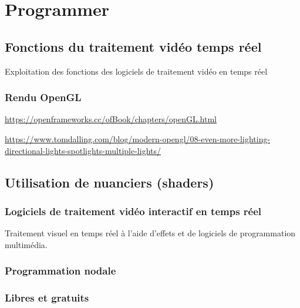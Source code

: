 \documentclass[
  french,
]{book}
\begin{document}
\hypertarget{programmer}{%
\chapter{Programmer}\label{programmer}}

\hypertarget{fonctions-du-traitement-viduxe9o-temps-ruxe9el}{%
\section{Fonctions du traitement vidéo temps réel}\label{fonctions-du-traitement-viduxe9o-temps-ruxe9el}}

Exploitation des fonctions des logiciels de traitement vidéo en temps réel

\hypertarget{rendu-opengl}{%
\subsection{Rendu OpenGL}\label{rendu-opengl}}

\url{https://openframeworks.cc/ofBook/chapters/openGL.html}

\url{https://www.tomdalling.com/blog/modern-opengl/08-even-more-lighting-directional-lights-spotlights-multiple-lights/}

\hypertarget{utilisation-de-nuanciers-shaders}{%
\section{Utilisation de nuanciers (shaders)}\label{utilisation-de-nuanciers-shaders}}

\hypertarget{traiter_logiciels}{%
\subsection{Logiciels de traitement vidéo interactif en temps réel}\label{traiter_logiciels}}

Traitement visuel en temps réel à l'aide d'effets et de logiciels de programmation multimédia.

\hypertarget{programmation-nodale}{%
\subsection{Programmation nodale}\label{programmation-nodale}}

\hypertarget{libres-et-gratuits}{%
\subsection{Libres et gratuits}\label{libres-et-gratuits}}
\end{document}
